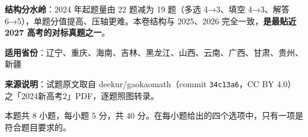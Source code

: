 

\begin{gknotice}
\textbf{结构分水岭}：2024 年起题量由 22 题减为 19 题（多选 4→3、填空 4→3、解答 6→5），单题分值提高、压轴更难。本卷结构与 2025、2026 完全一致，\textbf{是最贴近 2027 高考的对标真题之一}。

\textbf{适用省份}：辽宁、重庆、海南、吉林、黑龙江、山西、云南、广西、甘肃、贵州、新疆

\textbf{来源说明}：试题原文取自 deekur/gaokaomath（commit \texttt{34c13a6}，CC BY 4.0）之「2024新高考2」PDF，逐题照图转录。
\end{gknotice}

\par\medskip


\begin{gktip}
本题共 8 小题，每小题 5 分，共 40 分。在每小题给出的四个选项中，只有一项是符合题目要求的。
\end{gktip}

